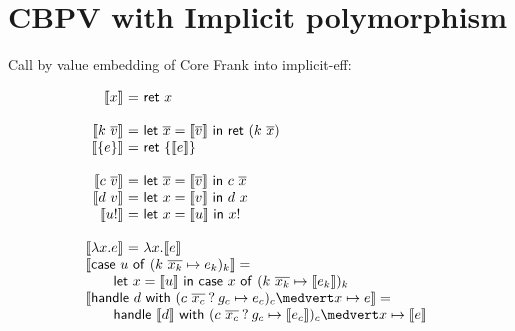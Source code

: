 \documentclass[preprint]{sigplanconf}
\makeatletter
\newcommand{\many}{\overline}
\newcommand{\sem}[1]{\llbracket{#1}\rrbracket}
\newcommand\ba{\begin{array}}
\newcommand\ea{\end{array}}
\newenvironment{equations}{\[\ba{@{}r@{~}c@{~}l@{}}}{\ea\]}
\newcommand{\key}[1]{\mathsf{#1}}
\newcommand{\handleSymbol}{\mathbin{?}}
\newcommand{\handle}[2]{{#1} \handleSymbol {#2}}
\newcommand{\thunk}[1]{\{{#1}\}}
\newcommand{\force}[1]{{#1}!}
\makeatother
\begin{document}


\section{CBPV with Implicit polymorphism}

Call by value embedding of Core Frank into implicit-eff:

\begin{equations}
\sem{x} &=& \key{ret}~x \\
\\
\sem{k~\many{v}} &=& \key{let}~\many{x}=\sem{\many{v}} ~\key{in}~\key{ret}~(k~\many{x}) \\
\sem{\thunk{e}} &=& \key{ret}~\thunk{\sem{e}} \\
\\
\sem{c~\many{v}} &=& \key{let}~\many{x}=\sem{\many{v}} ~\key{in}~c~\many{x} \\
\sem{d~v} &=& \key{let}~x=\sem{v} ~\key{in}~d~x \\
\sem{\force{u}} &=& \key{let}~x=\sem{u} ~\key{in}~\force{x} \\
\\
\sem{\lambda x.e} &=& \lambda x.\sem{e} \\
\multicolumn{3}{@{}l}{\sem{\key{case}~u~\key{of}~(k~\many{x_k} \mapsto e_k)_k} =} \\
\multicolumn{3}{@{}l}
  {\qquad \key{let}~x=\sem{u} ~\key{in}~
    \key{case}~x~\key{of}~(k~\many{x_k} \mapsto \sem{e_k})_k} \\
\multicolumn{3}{@{}l}{\sem{\key{handle}~d~\key{with}~(\handle{c~\many{x_c}}{g_c} \mapsto e_c)_c \medvert x \mapsto e} =} \\
\multicolumn{3}{@{}l}
  {\qquad \key{handle}~\sem{d}~\key{with}~ 
            (\handle{c~\many{x_c}}{g_c} \mapsto \sem{e_c})_c
            \medvert x \mapsto \sem{e}} \\
\end{equations}
\end{document}
